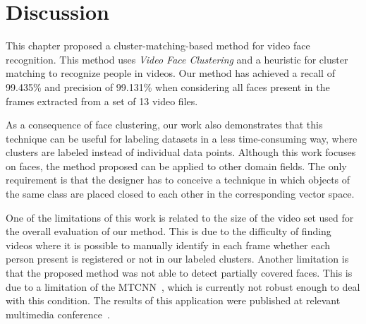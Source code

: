 \section{Discussion}
\label{sec:recognition_discussion}

This chapter proposed a cluster-matching-based method for video face recognition. 
This method uses \emph{Video Face Clustering} and a heuristic for cluster matching to recognize people in videos. 
Our method has achieved a recall of 99.435\% and precision of 99.131\% when considering all faces present in the frames extracted from a set of 13 video files.  

As a consequence of face clustering, our work also demonstrates that this technique can be useful for labeling datasets in a less time-consuming way, where clusters are labeled instead of individual data points.
Although this work focuses on faces, the method proposed can be applied to other domain fields.
The only requirement is that the designer has to conceive a technique in which objects of the same class are placed closed to each other in the corresponding vector space.

One of the limitations of this work is related to the size of the video set used for the overall evaluation of our method. 
This is due to the difficulty of finding videos where it is possible to manually identify in each frame whether each person present is registered or not in our labeled clusters.
Another limitation is that the proposed method was not able to detect partially covered faces. 
This is due to a limitation of the MTCNN~\cite{mtcnn}, which is currently not robust enough to deal with this condition.
The results of this application were published at relevant multimedia conference~\cite{mendes2020cluster}.
